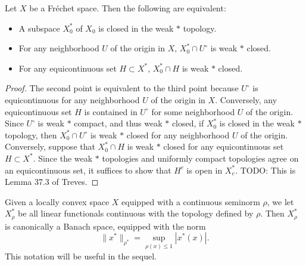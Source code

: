 \begin{theorem}
    Let $X$ be a Fr\'{e}chet space. Then the following are equivalent:
    \begin{itemize}
        \item A subspace $X_0^*$ of $X_0$ is closed in the weak $*$ topology.
        \item For any neighborhood $U$ of the origin in $X$, $X_0^* \cap U^\circ$ is weak $*$ closed.
        \item For any equicontinuous set $H \subset X^*$, $X_0^* \cap H$ is weak $*$ closed.
    \end{itemize}
\end{theorem}
\begin{proof}
    The second point is equivalent to the third point because $U^\circ$ is equicontinuous for any neighborhood $U$ of the origin in $X$. Conversely, any equicontinuous set $H$ is contained in $U^\circ$ for some neighborhood $U$ of the origin. Since $U^\circ$ is weak $*$ compact, and thus weak $*$ closed, if $X_0^*$ is closed in the weak $*$ topology, then $X_0^* \cap U^\circ$ is weak $*$ closed for any neighborhood $U$ of the origin. Conversely, suppose that $X_0^* \cap H$ is weak $*$ closed for any equicontinuous set $H \subset X^*$. Since the weak $*$ topologies and uniformly compact topologies agree on an equicontinuous set, it suffices to show that $H^c$ is open in $X^*_c$. TODO: This is Lemma 37.3 of Treves.
\end{proof}

Given a locally convex space $X$ equipped with a continuous seminorm $\rho$, we let $X^*_\rho$ be all linear functionals continuous with the topology defined by $\rho$. Then $X^*_\rho$ is canonically a Banach space, equipped with the norm
%
\[ \| x^* \|_{\rho^*} = \sup_{\rho(x) \leq 1} |x^*(x)|. \]
%
This notation will be useful in the sequel.

